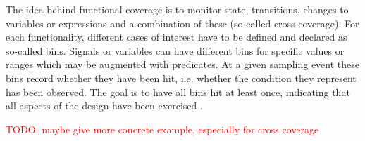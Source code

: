 \documentclass[11pt,a4paper]{report}
\newcommand{\todo}[1]{\textcolor{red}{TODO: #1}}
\begin{document}
The idea behind functional coverage is to monitor state, transitions, changes to variables or expressions and a
combination of these (so-called cross-coverage). For each functionality, different cases of interest have to be
defined and declared as so-called bins. Signals or variables can have different bins for specific values or ranges
which may be augmented with predicates. At a given sampling event these bins record whether they have been hit, i.e.
whether the condition they represent has been observed. The goal is to have all bins hit at least once, indicating
that all aspects of the design have been exercised \cite[Sec. 7.6]{flake2020a}.

\todo{maybe give more concrete example, especially for cross coverage}

\end{document}

